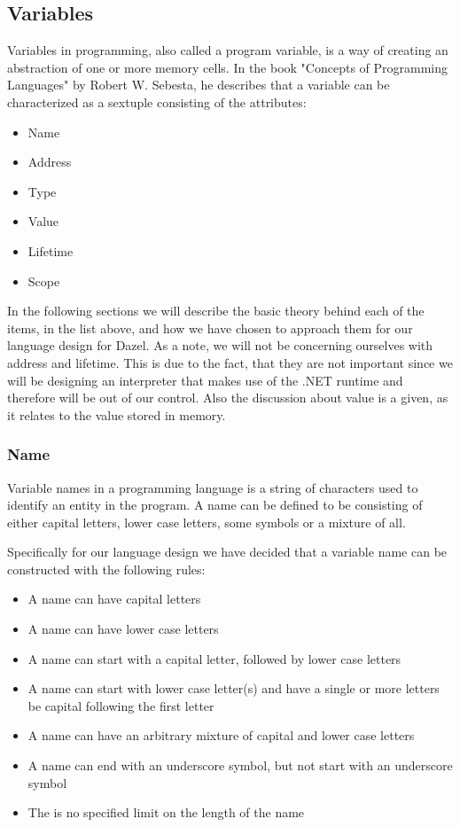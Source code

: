 \subsection{Variables}

Variables in programming, also called a program variable, is a way of creating an abstraction of one or more memory cells. In the book "Concepts of Programming Languages" by
Robert W. Sebesta\cite{sebesta_concepts_2016}, he describes that a variable can be characterized as a sextuple consisting of the attributes:

\begin{itemize}
    \item Name
    \item Address
    \item Type
    \item Value
    \item Lifetime
    \item Scope
\end{itemize}

In the following sections we will describe the basic theory behind each of the items, in the list above, and how we have chosen to approach them for our language design for Dazel.
As a note, we will not be concerning ourselves with address and lifetime. This is due to the fact, that they are not important since we will be designing an interpreter that makes use of the .NET runtime
and therefore will be out of our control. 
Also the discussion about value is a given, as it relates to the value stored in memory\cite{sebesta_concepts_2016}.


\subsubsection{Name}

Variable names in a programming language is a string of characters used to identify an entity in the program\cite{sebesta_concepts_2016}. A name can be defined to be consisting of either capital letters,
lower case letters, some symbols or a mixture of all.

Specifically for our language design we have decided that a variable name can be constructed with the following rules:

\begin{itemize}
    \item A name can have capital letters
    \item A name can have lower case letters
    \item A name can start with a capital letter, followed by lower case letters
    \item A name can start with lower case letter(s) and have a single or more letters be capital following the first letter
    \item A name can have an arbitrary mixture of capital and lower case letters
    \item A name can end with an underscore symbol, but not start with an underscore symbol
    \item The is no specified limit on the length of the name
\end{itemize}

